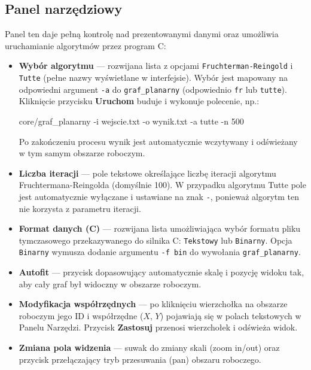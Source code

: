 \documentclass[a4paper, 11pt]{article}
\begin{document}
\subsection{Panel narz\k{e}dziowy}

Panel ten daje pe\l{}n\k{a} kontrol\k{e} nad prezentowanymi danymi oraz umo\.zliwia uruchamianie algorytm\'ow przez program C:

\begin{itemize}
    \item \textbf{Wyb\'or algorytmu} --- rozwijana lista z opcjami \texttt{Fruchterman-Reingold} i \texttt{Tutte} (pe\l{}ne nazwy wy\'swietlane w interfejsie). Wyb\'or jest mapowany na odpowiedni argument \texttt{-a} do \texttt{graf\_planarny} (odpowiednio \texttt{fr} lub \texttt{tutte}). Klikni\k{e}cie przycisku \textbf{Uruchom} buduje i wykonuje polecenie, np.:
  \begin{cmdbox}
core/graf\_planarny -i wejscie.txt -o wynik.txt -a tutte -n 500
  \end{cmdbox}
  Po zako\'nczeniu procesu wynik jest automatycznie wczytywany i od\'swie\.zany w tym samym obszarze roboczym.

  \item \textbf{Liczba iteracji} --- pole tekstowe okre\'slaj\k{a}ce liczb\k{e} iteracji algorytmu Fruchtermana-Reingolda (domy\'slnie 100). W przypadku algorytmu Tutte pole jest automatycznie wy\l{}\k{a}czane i ustawiane na znak \texttt{-}, poniewa\.z algorytm ten nie korzysta z parametru iteracji.

  \item \textbf{Format danych (C)} --- rozwijana lista umo\.zliwiaj\k{a}ca wyb\'or formatu pliku tymczasowego przekazywanego do silnika C: \texttt{Tekstowy} lub \texttt{Binarny}. Opcja \texttt{Binarny} wymusza dodanie argumentu \texttt{-f bin} do wywo\l{}ania \texttt{graf\_planarny}.

  \item \textbf{Autofit} --- przycisk dopasowuj\k{a}cy automatycznie skal\k{e} i pozycj\k{e} widoku tak, aby ca\l{}y graf by\l{} widoczny w obszarze roboczym.

  \item \textbf{Modyfikacja wsp\'o\l{}rz\k{e}dnych} --- po klikni\k{e}ciu wierzcho\l{}ka na obszarze roboczym jego ID i wsp\'o\l{}rz\k{e}dne ($X$, $Y$) pojawiaj\k{a} si\k{e} w polach tekstowych w Panelu Narz\k{e}dzi. Przycisk \textbf{Zastosuj} przenosi wierzcho\l{}ek i od\'swie\.za widok.

  \item \textbf{Zmiana pola widzenia} --- suwak do zmiany skali (zoom in/out) oraz przycisk prze\l{}\k{a}czaj\k{a}cy tryb przesuwania (pan) obszaru roboczego.


\end{itemize}
\end{document}
